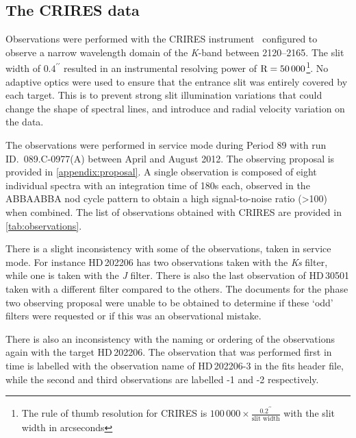 
\begin{landscape}
    
\end{landscape}

\subsection{The {CRIRES} data}
\label{subsec:CRIRES}

Observations were performed with the {CRIRES} instrument~\citep{kaeufl_crires_2004} configured to observe a narrow wavelength domain of the \emph{K}-band between 2120--2165\nm{}.
The slit width of \(0.4^{\prime\prime}\) resulted in an instrumental resolving power of \(\textrm{R}=50\,000\)\footnote{The rule of thumb resolution for {CRIRES} is \(100\,000\times \frac{0.2^{\prime\prime}}{\textrm{slit width}}\) with the slit width in arcseconds}.
No adaptive optics were used to ensure that the entrance slit was entirely covered by each target.
This is to prevent strong slit illumination variations that could change the shape of spectral lines, and introduce and radial velocity variation on the data.

The observations were performed in service mode during {Period 89} with run {ID.~089.C-0977(A)} between April and August 2012.
The observing proposal is provided in \cref{appendix:proposal}.
A single observation is composed of eight individual spectra with an integration time of 180\si{\second} each, observed in the {ABBAABBA} nod cycle pattern to obtain a high signal-to-noise ratio (>100) when combined.
The list of observations obtained with {CRIRES} are provided in \cref{tab:observations}.

There is a slight inconsistency with some of the observations, taken in service mode.
For instance {HD\,202206} has two observations taken with the \emph{Ks} filter, while one is taken with the \emph{J} filter.
There is also the last observation of {HD\,30501} taken with a different filter compared to the others.
The documents for the phase two observing proposal were unable to be obtained to determine if these `odd' filters were requested or if this was an observational mistake.

There is also an inconsistency with the naming or ordering of the observations again with the target {HD\,202206}.
The observation that was performed first in time is labelled with the observation name of {HD\,202206-3} in the fits header file, while the second and third observations are labelled -1 and -2 respectively.

